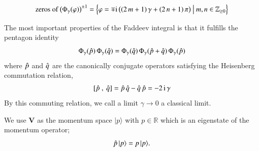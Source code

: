 \documentclass[12pt,reqno]{amsart}
\numberwithin{equation}{section}
\newcommand{\I}{\mathrm{i}}
\begin{document}
  \begin{equation}
    \text{zeros of $\bigl( \Phi_\gamma(\varphi) \bigr)^{\pm 1}$}
    =
    \Bigl\{
    \varphi =
    \mp \I \,
    \bigl(
    (2 \, m +1 ) \, \gamma +
    ( 2 \, n + 1 ) \, \pi
    \bigr)
    \ \big| \
    m, n \in \mathbb{Z}_{\geq 0}
    \Bigr\}
  \end{equation}



The most important properties of the Faddeev integral is that
it fulfills the pentagon
identity~\cite{FaddKash94,LFadd99b}
\begin{equation}
  \label{pentagon_Phi}
  \Phi_\gamma(\Hat{p}) \, \Phi_\gamma(\Hat{q})
  =
  \Phi_\gamma(\Hat{q}) \, \Phi_\gamma(\Hat{p} + \Hat{q}) \,
  \Phi_\gamma(\Hat{p})  
\end{equation}
where $\Hat{p}$ and $\Hat{q}$ are the canonically conjugate
operators satisfying the Heisenberg commutation relation,
\begin{equation}
  \label{canonical}
  [\Hat{p} ~,~ \Hat{q} ]
  = \Hat{p} \, \Hat{q} - \Hat{q} \, \Hat{p}
  = - 2 \, \I \, \gamma   
\end{equation}
By this commuting relation, we call a limit $\gamma\to 0$  a
classical limit.

We use
$\mathbf{V}$ as the momentum space $|p\rangle$ with
$p\in\mathbb{R}$ which is  an eigenstate of the momentum operator;
\begin{equation}
  \Hat{p} \, | p \rangle
  =
  p \, | p \rangle .
\end{equation}
\end{document}
